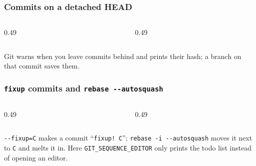 \documentclass[aspectratio=169,10pt,compress]{beamer}
\begin{document}
\begin{frame}[t,fragile] \frametitle{Commits on a detached HEAD}
  \begin{columns}[T]
    \begin{column}{0.49\textwidth}
    \end{column}
    \begin{column}{0.49\textwidth}
    \end{column}
  \end{columns}

  \vspace{0.1em}
  \small
  Git warns when you leave commits behind and prints their hash; a branch on that commit saves them.
\end{frame}





\begin{frame}[t,fragile] \frametitle{\texttt{fixup} commits and \texttt{rebase -{}-autosquash}}
  \begin{columns}[T]
    \begin{column}{0.49\textwidth}
    \end{column}
    \begin{column}{0.49\textwidth}
    \end{column}
  \end{columns}

  \vspace{0.1em}
  \small
  \texttt{-{}-fixup=C} makes a commit ``\texttt{fixup! C}''; \texttt{rebase -i -{}-autosquash} moves it next to \texttt{C} and melts it in.
  Here \texttt{GIT\_SEQUENCE\_EDITOR} only prints the todo list instead of opening an editor.
\end{frame}
\end{document}
